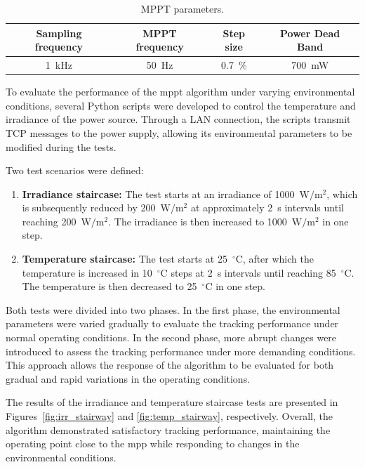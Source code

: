         \begin{table}[!ht]
        \centering
        \caption{MPPT parameters.}
        \label{tab:MPPT_config}
            \begin{tabular}{|c|c|c|c|}
            \hline
            Sampling frequency & MPPT frequency & Step size & Power Dead Band \\
            \hline
            1~kHz & 50~Hz & 0.7~\% & 700~mW \\
            \hline
            \end{tabular}
        \end{table}

        To evaluate the performance of the \ac{mppt} algorithm under varying environmental conditions, several Python scripts were developed to control the temperature and irradiance of the power source. Through a LAN connection, the scripts transmit TCP messages to the power supply, allowing its environmental parameters to be modified during the tests.

        Two test scenarios were defined:

        \begin{enumerate}[leftmargin=4em, itemsep=1pt, topsep=2pt]
            \item \textbf{Irradiance staircase:} The test starts at an irradiance of 1000~$\mathrm{W/m^2}$, which is subsequently reduced by 200~$\mathrm{W/m^2}$ at approximately 2~s intervals until reaching 200~$\mathrm{W/m^2}$. The irradiance is then increased to 1000~$\mathrm{W/m^2}$ in one step.

            \item \textbf{Temperature staircase:} The test starts at 25~$^\circ$C, after which the temperature is increased in 10~$^\circ$C steps at 2~s intervals until reaching 85~$^\circ$C. The temperature is then decreased to 25~$^\circ$C in one step.
        \end{enumerate}

        Both tests were divided into two phases. In the first phase, the environmental parameters were varied gradually to evaluate the tracking performance under normal operating conditions. In the second phase, more abrupt changes were introduced to assess the tracking performance under more demanding conditions. This approach allows the response of the algorithm to be evaluated for both gradual and rapid variations in the operating conditions.

        The results of the irradiance and temperature staircase tests are presented in Figures~\ref{fig:irr_stairway} and \ref{fig:temp_stairway}, respectively. Overall, the algorithm demonstrated satisfactory tracking performance, maintaining the operating point close to the \ac{mpp} while responding to changes in the environmental conditions.


